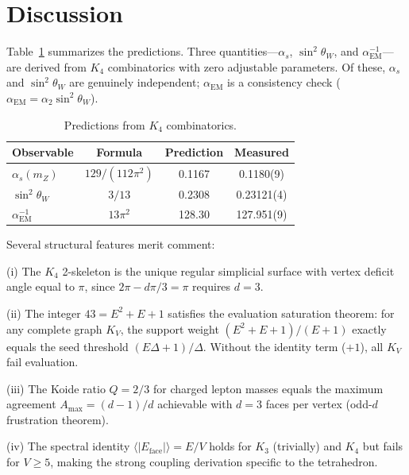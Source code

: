 \documentclass[aps,prl,twocolumn,superscriptaddress,showpacs]{revtex4-2}
\begin{document}

\section{Discussion}

Table~\ref{tab:results} summarizes the predictions. Three
quantities---$\alpha_s$, $\sin^2\theta_W$, and
$\alpha_{\mathrm{EM}}^{-1}$---are derived from $K_4$ combinatorics
with zero adjustable parameters. Of these, $\alpha_s$ and
$\sin^2\theta_W$ are genuinely independent; $\alpha_{\mathrm{EM}}$
is a consistency check ($\alpha_{\mathrm{EM}} = \alpha_2 \sin^2\theta_W$).

\begin{table}[h]
\caption{Predictions from $K_4$ combinatorics.\label{tab:results}}
\begin{ruledtabular}
\begin{tabular}{lccc}
Observable & Formula & Prediction & Measured \\
\hline
$\alpha_s(m_Z)$ & $129/(112\pi^2)$ & 0.1167 & 0.1180(9) \\
$\sin^2\theta_W$ & $3/13$ & 0.2308 & 0.23121(4) \\
$\alpha_{\mathrm{EM}}^{-1}$ & $13\pi^2$ & 128.30 & 127.951(9) \\
\end{tabular}
\end{ruledtabular}
\end{table}

Several structural features merit comment:

(i) The $K_4$ 2-skeleton is the unique regular simplicial surface
with vertex deficit angle equal to $\pi$, since
$2\pi - d\pi/3 = \pi$ requires $d = 3$.

(ii) The integer $43 = E^2 + E + 1$ satisfies the evaluation
saturation theorem: for any complete graph $K_V$, the support
weight $(E^2+E+1)/(E+1)$ exactly equals the seed threshold
$(E\Delta+1)/\Delta$. Without the identity term ($+1$), all
$K_V$ fail evaluation.

(iii) The Koide ratio $Q = 2/3$ for charged lepton masses equals
the maximum agreement $A_{\max} = (d-1)/d$ achievable with $d = 3$
faces per vertex (odd-$d$ frustration theorem).

(iv) The spectral identity $\langle |E_{\mathrm{face}}| \rangle
= E/V$ holds for $K_3$ (trivially) and $K_4$ but fails for
$V \geq 5$, making the strong coupling derivation specific to
the tetrahedron.
\end{document}
